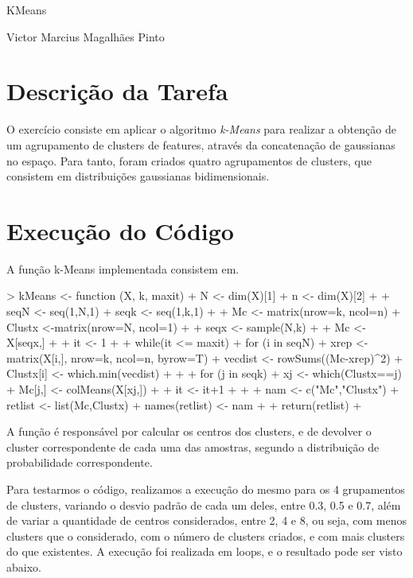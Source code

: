 \documentclass[12pt,a4paper,titlepage]{article}
\begin{document}


\begin{center}
{\huge KMeans}

{\large Victor Marcius Magalhães Pinto}
\end{center}

\section{Descrição da Tarefa}

O exercício consiste em aplicar o algoritmo \textit{k-Means} para realizar a obtenção de um agrupamento de clusters de features, através da concatenação de gaussianas no espaço. Para tanto, foram criados quatro agrupamentos de clusters, que consistem em distribuições gaussianas bidimensionais.

\section{Execução do Código}

A função k-Means implementada consistem em.


\begin{Schunk}
\begin{Sinput}
> kMeans <- function (X, k, maxit) {
+   N <- dim(X)[1]
+   n <- dim(X)[2]
+   
+   seqN <- seq(1,N,1)
+   seqk <- seq(1,k,1)
+   
+   Mc <- matrix(nrow=k, ncol=n)
+   Clustx <-matrix(nrow=N, ncol=1)
+   
+   seqx <- sample(N,k)
+   
+   Mc <- X[seqx,]
+   
+   it <- 1
+   
+   while(it <= maxit){
+     for (i in seqN) {
+       xrep <- matrix(X[i,], nrow=k, ncol=n, byrow=T)
+       vecdist <- rowSums((Mc-xrep)^2)
+       Clustx[i] <- which.min(vecdist)
+     }
+     
+     for (j in seqk) {
+       xj <- which(Clustx==j)
+       Mc[j,] <- colMeans(X[xj,])
+     }
+     it <- it+1
+   }
+   
+   nam <- c("Mc","Clustx")
+   retlist <- list(Mc,Clustx)
+   names(retlist) <- nam
+   
+   return(retlist)
+ }
\end{Sinput}
\end{Schunk}

A função é responsável por calcular os centros dos clusters, e de devolver o cluster correspondente de cada uma das amostras, segundo a distribuição de probabilidade correspondente.

Para testarmos o código, realizamos a execução do mesmo para os 4 grupamentos de clusters, variando o desvio padrão de cada um deles, entre 0.3, 0.5 e 0.7, além de variar a quantidade de centros considerados, entre 2, 4 e 8, ou seja, com menos clusters que o considerado, com o número de clusters criados, e com mais clusters do que existentes. A execução foi realizada em loops, e o resultado pode ser visto abaixo.
\end{document}
